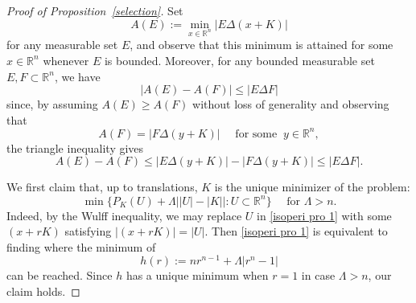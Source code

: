 \documentclass[reqno,11pt]{amsart}
\numberwithin{equation}{section}
\theoremstyle{remark}
\begin{document}
\begin{proof}[Proof of Proposition~\ref{selection}]
 Set
 $$A(E):=\min_{x\in\mathbb R^n}|E\Delta( x+K)|$$
    for any measurable set $E$, and observe that this minimum is attained  for some $x\in\mathbb R^n$ whenever $E$ is bounded.
Moreover, for any bounded measurable set $E, F\subset \mathbb R^n$, we have
\begin{equation}\label{triangle index}
    |A(E)-A(F)|\le |E\Delta F| 
\end{equation}
since, by assuming $A(E)\ge A(F)$ without loss of generality and observing that  
$$A(F)=|F\Delta (y+K)| \quad \text{ for some }\ y\in \mathbb R^n,$$
the triangle inequality gives
$$A(E)-A(F)\le |E\Delta (y+K)|-|F\Delta (y+K)|\le |E\Delta F|.$$

\medskip    
{}
    We first claim that, up to translations, $ K$ is the unique minimizer of the problem:
    \begin{equation}\label{isoperi pro 1}
        \min\{P_K(U)+\Lambda\big||U|-|K|\big|:U\subset\mathbb R^n\}\quad \text{ for $\Lambda>n$}.
    \end{equation}
    Indeed, by the Wulff inequality, we may replace $U$ in \eqref{isoperi pro 1} with some $(x+rK)$ satisfying $|(x+rK)|=|U|$. Then \eqref{isoperi pro 1} is equivalent to finding   where the minimum of 
    $$h(r):=nr^{n-1}+\Lambda|r^n-1|$$
    can be reached. Since $h$ has a unique minimum when $r=1$ in case $\Lambda >n$, our claim holds.


\end{proof}
\end{document}
